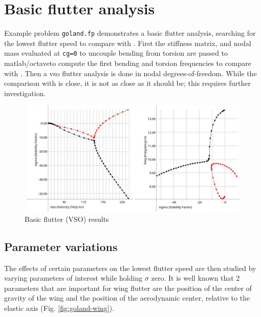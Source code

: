 \documentclass[11pt,openany,twoside]{book}
\numberwithin{equation}{section}		%
\newcommand{\Cmd}[1]{{\sf #1}}
\newcommand{\Code}[1]{{\small\tt #1}}
\newcommand{\Octlab}{\Cmd{matlab}/\Cmd{octave}\:}
\newcommand{\Figref}[1]{Fig. \ref{#1}}  %
\begin{document}
\section{Basic flutter analysis}\label{ex:goland-vso}
Example problem \Code{goland.fp} demonstrates a basic flutter analysis,
searching for the lowest flutter speed to compare with \cite{goland1945flutter}.
First the stiffness matrix, and nodal mass evaluated at \Code{cg=0} to
uncouple bending from torsion
are passed to \Octlab to compute the first bending and torsion frequencies
to compare with \cite{goland1945flutter}. Then a vso flutter analysis is done
in nodal degrees-of-freedom.
While the comparison with \cite{goland1945flutter} is close, it is not
as close as it should be; this requires further investigation.
\begin{figure}[ht]
		\includegraphics[height=5.5cm,width=12.5cm]{goland-vso.jpg}
	\centering
	\caption{Basic flutter (VSO) results} \label{fig:goland-vso}
\end{figure}

\subsection{Parameter variations}
The effects of certain parameters on the lowest flutter speed are then
studied by varying parameters of interest while holding $\sigma$ zero.
It is well known that 2 parameters that are important for wing flutter are
the position of the center of gravity of the wing and the position of
the aerodynamic center, relative to the elastic axis (\Figref{fig:goland-wing}).

\end{document}
